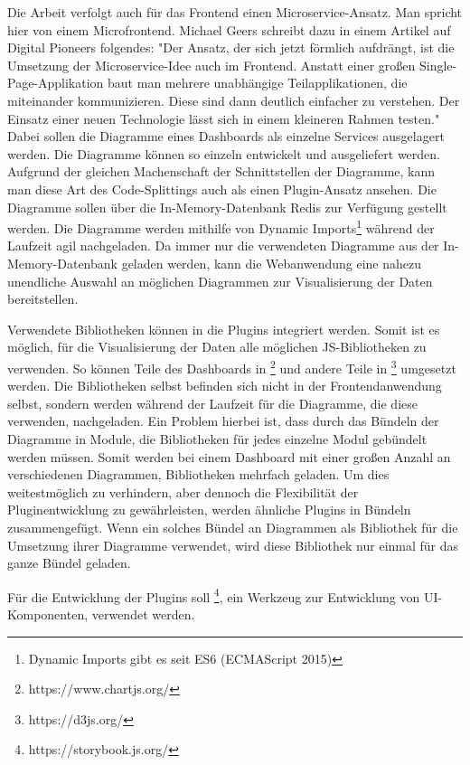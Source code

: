 Die Arbeit verfolgt auch für das Frontend einen Microservice-Ansatz. Man spricht hier von einem
Microfrontend. Michael Geers schreibt dazu in einem Artikel auf Digital Pioneers folgendes:
"Der Ansatz, der sich jetzt förmlich aufdrängt, ist die Umsetzung der Microservice-Idee
auch im Frontend. Anstatt einer ­großen Single-Page-Applikation baut man mehrere unabhängige
Teilapplikationen, die miteinander kommunizieren. Diese sind dann deutlich einfacher zu verstehen.
Der Einsatz einer neuen Technologie lässt sich in einem kleineren Rahmen testen."\cite{MicrofrontendT3N}
Dabei sollen die Diagramme eines Dashboards als einzelne Services ausgelagert werden.
Die Diagramme können so einzeln entwickelt und ausgeliefert werden. Aufgrund der
gleichen Machenschaft der Schnittstellen der Diagramme, kann man diese Art des Code-Splittings auch als
einen Plugin-Ansatz ansehen. Die Diagramme sollen über die In-Memory-Datenbank
Redis zur Verfügung gestellt werden. Die Diagramme werden mithilfe
von Dynamic Imports\footnote{Dynamic Imports gibt es seit ES6 (ECMAScript 2015)\cite{DynamicImportsV8}}
während der Laufzeit agil nachgeladen. Da immer nur die verwendeten Diagramme aus der In-Memory-Datenbank
geladen werden, kann die Webanwendung eine nahezu unendliche Auswahl an möglichen Diagrammen zur Visualisierung
der Daten bereitstellen.

Verwendete Bibliotheken können in die Plugins integriert werden. Somit ist es möglich, für die Visualisierung
der Daten alle möglichen JS-Bibliotheken zu verwenden. So können Teile des Dashboards
in \footnote{https://www.chartjs.org/} und andere Teile in \footnote{https://d3js.org/}
umgesetzt werden. Die Bibliotheken selbst befinden sich nicht in der Frontendanwendung selbst,
sondern werden während der Laufzeit für die Diagramme, die diese verwenden, nachgeladen.
Ein Problem hierbei ist, dass durch das Bündeln der Diagramme in Module, die Bibliotheken für jedes einzelne
Modul gebündelt werden müssen. Somit werden bei einem Dashboard mit einer großen Anzahl an verschiedenen
Diagrammen, Bibliotheken mehrfach geladen. Um dies weitestmöglich zu verhindern, aber dennoch die Flexibilität
der Pluginentwicklung zu gewährleisten, werden ähnliche Plugins in Bündeln zusammengefügt. Wenn ein solches
Bündel an Diagrammen  als Bibliothek für die Umsetzung ihrer Diagramme verwendet, wird diese
Bibliothek nur einmal für das ganze Bündel geladen.

Für die Entwicklung der Plugins soll \footnote{https://storybook.js.org/}, ein Werkzeug
zur Entwicklung von UI-Komponenten, verwendet werden.

